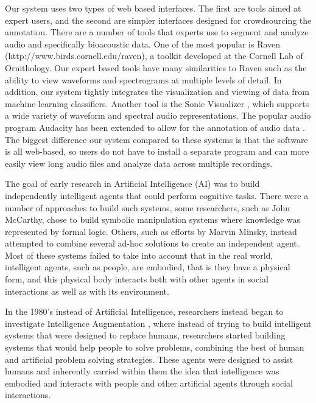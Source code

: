 \documentclass[12pt,oneside]{book}
\begin{document}
Our system uses two types of web based interfaces.  The first are
tools aimed at expert users, and the second are simpler interfaces
designed for crowdsourcing the annotation. There are a number of tools
that experts use to segment and analyze audio and specifically
bioacoustic data.  One of the most popular is Raven
(http://www.birds.cornell.edu/raven), a toolkit developed at the
Cornell Lab of Ornithology.  Our expert based tools have many
similarities to Raven such as the ability to view waveforms and
spectrograms at multiple levels of detail. In addition, our system
tightly integrates the visualization and viewing of data from machine
learning classifiers.  Another tool is the Sonic Visualizer
\cite{cannam10}, which supports a wide variety of waveform and
spectral audio representations. The popular audio program Audacity has
been extended to allow for the annotation of audio data \cite{li06}.
The biggest difference our system compared to these systems is that
the software is all web-based, so users do not have to install a
separate program and can more easily view long audio files and analyze
data across multiple recordings.

The goal of early research in Artificial Intelligence (AI) was to
build independently intelligent agents that could perform cognitive
tasks.  There were a number of approaches to build such systems, some
researchers, such as John McCarthy, chose to build symbolic
manipulation systems where knowledge was represented by formal logic.
Others, such as efforts by Marvin Minsky, instead attempted to combine
several ad-hoc solutions to create an independent agent.  Most of
these systems failed to take into account that in the real world,
intelligent agents, such as people, are embodied, that is they have a
physical form, and this physical body interacts both with other agents
in social interactions as well as with its environment. 

In the 1980's instead of Artificial Intelligence, researchers instead
began to investigate Intelligence Augmentation \cite{fischer92}, where
instead of trying to build intelligent systems that were designed to
replace humans, researchers started building systems that would help
people to solve problems, combining the best of human and artificial
problem solving strategies.  These agents were designed to assist
humans and inherently carried within them the idea that intelligence
was embodied and interacts with people and other artificial agents
through social interactions.
\end{document}
